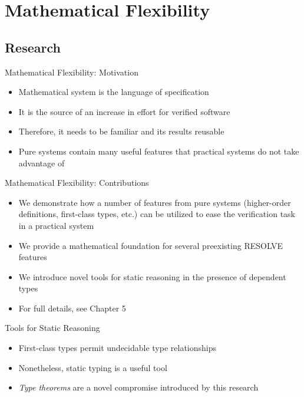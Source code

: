 \section{Mathematical Flexibility}

\lstset{
	basicstyle=\footnotesize
}


\subsection{Research}
\begin{frame}{Mathematical Flexibility: Motivation}
	\begin{itemize}
		\item Mathematical system is the language of specification
		\item It is the source of an increase in effort for verified software
		\item Therefore, it needs to be familiar and its results reusable
		\item Pure systems contain many useful features that practical systems do not take advantage of
	\end{itemize}
\end{frame}

\begin{frame}{Mathematical Flexibility: Contributions}
	\begin{itemize}
		\item We demonstrate how a number of features from pure systems (higher-order definitions, first-class types, etc.) can be utilized to ease the verification task in a practical system
		\item We provide a mathematical foundation for several preexisting RESOLVE features
		\item We introduce novel tools for static reasoning in the presence of dependent types
		\item For full details, see Chapter 5
	\end{itemize}
\end{frame}



\begin{frame}{Tools for Static Reasoning}
	\begin{itemize}
		\item First-class types permit undecidable type relationships
		\item Nonetheless, static typing is a useful tool
		\item \emph{Type theorems} are a novel compromise introduced by this research
	\end{itemize}
	\vspace{2em}
	
\end{frame}

